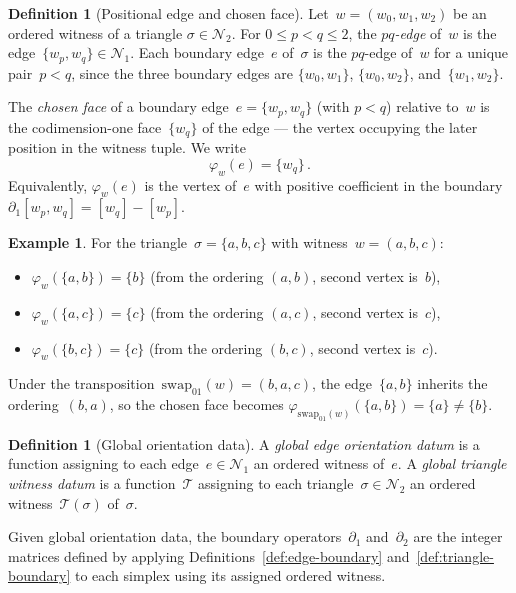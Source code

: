 \documentclass[11pt,a4paper]{article}
\theoremstyle{plain}
\theoremstyle{definition}
\newtheorem{definition}[theorem]{Definition}
\newtheorem{example}[theorem]{Example}
\theoremstyle{remark}
\newcommand{\cN}{\mathcal{N}}
\newcommand{\cT}{\mathcal{T}}
\newcommand{\swapAB}{\mathrm{swap}_{01}}
\newcommand{\chosenface}{\varphi}
\begin{document}
\begin{definition}[Positional edge and chosen face]
\label{def:chosen-face}
Let~$w = (w_0, w_1, w_2)$ be an ordered witness of a triangle
$\sigma \in \cN_2$. For $0 \leq p < q \leq 2$, the \emph{$pq$-edge}
of~$w$ is the edge~$\{w_p, w_q\} \in \cN_1$.
Each boundary edge~$e$ of~$\sigma$ is the $pq$-edge of~$w$ for a unique
pair~$p < q$, since the three boundary edges are
$\{w_0,w_1\}$, $\{w_0,w_2\}$, and~$\{w_1,w_2\}$.

The \emph{chosen face} of a boundary edge~$e = \{w_p, w_q\}$ (with $p < q$)
relative to~$w$ is the codimension-one face~$\{w_q\}$ of the edge ---
the vertex occupying the later position in the witness tuple. We write
\[
  \chosenface_w(e) = \{w_q\}\,.
\]
Equivalently, $\chosenface_w(e)$ is the vertex of~$e$ with positive
coefficient in the boundary~$\partial_1[w_p, w_q] = [w_q] - [w_p]$.
\end{definition}

\begin{example}
\label{ex:chosen}
For the triangle~$\sigma = \{a,b,c\}$ with witness~$w = (a,b,c)$:
\begin{itemize}[nosep]
  \item $\chosenface_w(\{a,b\}) = \{b\}$
        \quad (from the ordering $(a,b)$, second vertex is~$b$),
  \item $\chosenface_w(\{a,c\}) = \{c\}$
        \quad (from the ordering $(a,c)$, second vertex is~$c$),
  \item $\chosenface_w(\{b,c\}) = \{c\}$
        \quad (from the ordering $(b,c)$, second vertex is~$c$).
\end{itemize}
Under the transposition~$\swapAB(w) = (b,a,c)$, the edge~$\{a,b\}$
inherits the ordering~$(b,a)$, so the chosen face becomes
$\chosenface_{\swapAB(w)}(\{a,b\}) = \{a\} \neq \{b\}$.
\end{example}

\begin{definition}[Global orientation data]
\label{def:global-orientation}
A \emph{global edge orientation datum} is a function assigning to each
edge~$e \in \cN_1$ an ordered witness of~$e$.
A \emph{global triangle witness datum} is a function~$\cT$ assigning to
each triangle~$\sigma \in \cN_2$ an ordered witness~$\cT(\sigma)$ of~$\sigma$.
\end{definition}

Given global orientation data, the boundary operators~$\partial_1$
and~$\partial_2$ are the integer matrices defined by applying
Definitions~\ref{def:edge-boundary} and~\ref{def:triangle-boundary}
to each simplex using its assigned ordered witness.
\end{document}
